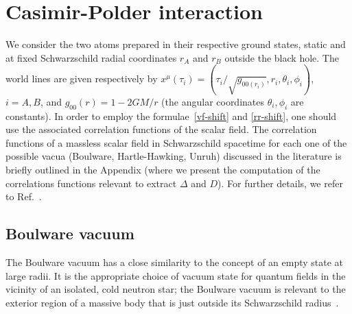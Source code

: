 \documentclass[twocolumn,prd,aps,showpacs,amsmath,amssymb]{revtex4-1}
\begin{document}
\section{Casimir-Polder interaction}
\label{calculation}

We consider the two atoms prepared in their respective ground states,
static and at fixed Schwarzschild radial coordinates $r_{A}$ and
$r_{B}$ outside the  black hole. The world lines are given
respectively by $x^{\mu}(\tau_i) = (\tau_i/\sqrt{g_{00(r_i)}} , r_i,
\theta_i, \phi_i)$, $i = A, B$, and $g_{00}(r) = 1 - 2GM/r$ (the angular
coordinates $\theta_i, \phi_i$ are constants). In order to employ the
formulae~\eqref{vf-shift} and \eqref{rr-shift}, one should use the
associated 
correlation functions of the scalar field. The correlation functions
of a massless scalar field in Schwarzschild spacetime for each one of
the possible vacua (Boulware, Hartle-Hawking, Unruh) discussed in the
literature is briefly outlined in the Appendix (where we present the
computation of the correlations functions relevant to extract $\Delta$
and $D$). For further details, we refer to Ref.~\cite{frolov}. 


\subsection{Boulware vacuum}
\label{Boulware}


The Boulware vacuum has a close similarity to the  concept of an empty
state at large radii. It is the appropriate choice of vacuum state for
quantum fields in the vicinity of an isolated, cold neutron star;  the
Boulware vacuum is relevant to the exterior region of a massive body
that is  just outside its Schwarzschild radius~\cite{boul,sciama}. 
\end{document}
